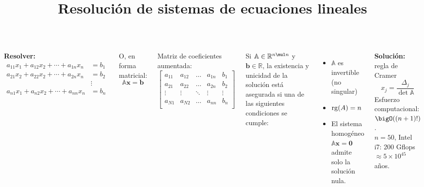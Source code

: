 \documentclass[9pt, aspectratio=169]{beamer}
\title{Resolución de sistemas de ecuaciones lineales}
\subtitle{}
\begin{document}
\maketitle

\begin{frame}
\begin{columns}[t]
\textbf{Resolver:}
\begin{align*}
    a_{11}x_1+a_{12}x_2+\cdots +a_{1n}x_n &= b_1 \\
    a_{21}x_2+a_{22}x_2+\cdots +a_{2n}x_n &= b_2 \\
                                   & \vdots \\
    a_{n1}x_1+a_{n2}x_2+\cdots +a_{nn}x_n &= b_n \\
 \end{align*} \pause
\vspace{-2em}

 O, en forma matricial:
 \begin{equation*}
  \mathbb{A} \mathbf{x} = \mathbf{b}
 \end{equation*}  \pause
\vspace{-1em}

  Matriz de coeficientes aumentada:
\begin{equation*}
 \left[ 
 \begin{array}{cccc|c}
 a_{11} & a_{12} & \ldots & a_{1n} & b_1 \\
 a_{21} & a_{22} & \ldots & a_{2n} & b_2\\
 \vdots & \vdots & \ddots & \vdots & \vdots\\
 a_{N1} & a_{N2} & \ldots & a_{nn} & b_n \\
 \end{array} \right] 
\end{equation*} \pause


Si $\mathbb{A} \in \mathbb{R}^{n \mul n}$ y $\bm{b} \in \mathbb{R}$, la existencia y unicidad de la solución está asegurada si una de las siguientes condiciones se cumple:
\begin{itemize}
    \item $\mathbb{A}$ es invertible (no singular)
    \item $\operatorname{rg}(A) = n$
    \item El sistema homogéneo $\mathbb{A} \bm{x} = \bm{0}$ admite solo la solución nula.
\end{itemize}

\hrulefill \pause \vspace{1em}


\textbf{Solución:} regla de Cramer
\[ x_j = \frac{\Delta_j}{\det{\mathbb{A}}} \]
Esfuerzo computacional: $\bigO((n+ 1)!)$. \\
$n = 50$, Intel i7: 200 Gflops $\approx 5 \times 10^{45}$ años.

\end{columns}
\end{frame}
\end{document}
